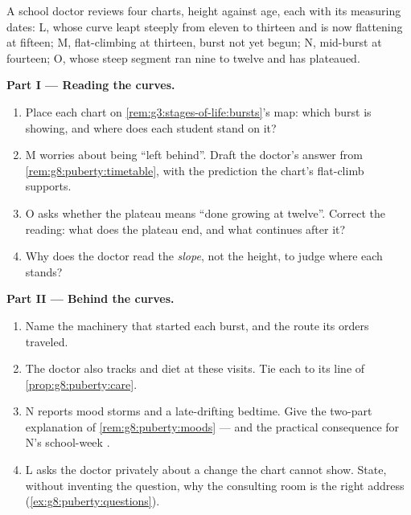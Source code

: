 \begin{problem}\label{pb:g8:puberty:1}
A school doctor reviews four charts, height against age,
each with its measuring dates: L, whose curve leapt
steeply from eleven to thirteen and is now flattening at
fifteen; M, flat-climbing at thirteen, burst not yet
begun; N, mid-burst at fourteen; O, whose steep segment
ran nine to twelve and has plateaued.

\medskip\noindent\textbf{Part I --- Reading the curves.}
\begin{enumerate}
  \item Place each chart on
        \cref{rem:g3:stages-of-life:bursts}'s map: which
        burst is showing, and where does each student
        stand on it?
  \item M worries about being ``left behind''. Draft the
        doctor's answer from
        \cref{rem:g8:puberty:timetable}, with the
        prediction the chart's flat-climb supports.
  \item O asks whether the plateau means ``done growing
        at twelve''. Correct the reading: what does the
        plateau end, and what continues after it?
  \item Why does the doctor read the \emph{slope}, not
        the height, to judge where each stands?
\end{enumerate}

\medskip\noindent\textbf{Part II --- Behind the curves.}
\begin{enumerate}[resume]
  \item Name the machinery that started each burst, and
        the route its orders traveled.
  \item The doctor also tracks  and diet at these
        visits. Tie each to its line of
        \cref{prop:g8:puberty:care}.
  \item N reports mood storms and a late-drifting
        bedtime. Give the two-part explanation of
        \cref{rem:g8:puberty:moods} --- and the practical
        consequence for N's school-week .
  \item L asks the doctor privately about a change the
        chart cannot show. State, without inventing the
        question, why the consulting room is the right
        address (\cref{ex:g8:puberty:questions}).
\end{enumerate}


\end{problem}
